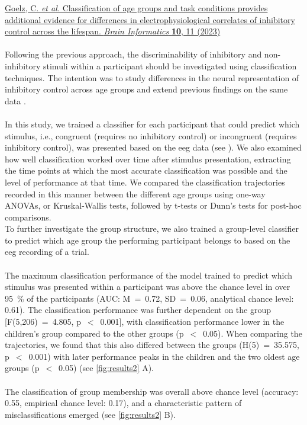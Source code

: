 \hyperref[pub:paperII]{Goelz, C. \textit{et al.} Classification of age groups and task conditions provides additional evidence for differences in electrophysiological correlates of inhibitory control across the lifespan. \textit{Brain Informatics} \textbf{10}, 11 (2023)}\\
\\
Following the previous approach, the discriminability of inhibitory and non-inhibitory stimuli within a participant should be investigated using classification techniques. The intention was to study differences in the neural representation of inhibitory control across age groups and extend previous findings on the same data \cite{Reuter2019}.\\
\\
In this study, we trained a classifier for each participant that could predict which stimulus, i.e., congruent (requires no inhibitory control) or incongruent (requires inhibitory control), was presented based on the \gls{eeg} data (see ). We also examined how well classification worked over time after stimulus presentation, extracting the time points at which the most accurate classification was possible and the level of performance at that time. We compared the classification trajectories recorded in this manner between the different age groups using one-way ANOVAs, or Kruskal-Wallis tests, followed by t-tests or Dunn's tests for post-hoc comparisons.\\
To further investigate the group structure, we also trained a group-level classifier to predict which age group the performing participant belongs to based on the \gls{eeg} recording of a trial.\\
\\
The maximum classification performance of the model trained to predict which stimulus was presented within a participant was above the chance level in over 95~\% of the participants (AUC: M~=~0.72, SD~=~0.06, analytical chance level: 0.61). The classification performance was further dependent on the group [F(5,206)~=~4.805, p~$<$~0.001], with classification performance lower in the children's group compared to the other groups (p~$<$~0.05). When comparing the trajectories, we found that this also differed between the groups (H(5)~=~35.575, p~$<$~0.001) with later performance peaks in the children and the two oldest age groups (p~$<$~0.05) (see \autoref{fig:results2} A).\\
\\
The classification of group membership was overall above chance level (accuracy: 0.55, empirical chance level: 0.17), and a characteristic pattern of misclassifications emerged (see \autoref{fig:results2} B).\\

